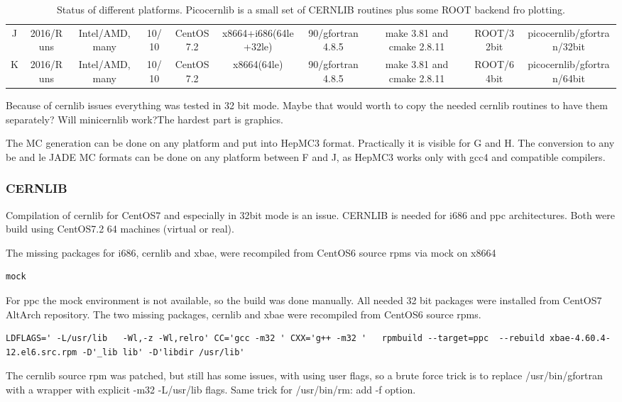\begin{sidewaystable}[htbp]
\begin{tabular}{|c|c|c|c|c|c|c|c|c|c|}
J   & 2016/Runs         &  Intel/AMD, many            &10/10   &CentOS7.2 & x8664+i686(64le+32le)   & 90/gfortran 4.8.5         &make 3.81 and cmake 2.8.11      &ROOT/32bit& picocernlib/gfortran/32bit     \\
K   & 2016/Runs         &  Intel/AMD, many            &10/10   &CentOS7.2 & x8664(64le)             & 90/gfortran 4.8.5         &make 3.81 and cmake 2.8.11      &ROOT/64bit& picocernlib/gfortran/64bit\\
\hline
\end{tabular}
\caption{Status of different platforms.  Picocernlib is a small set of CERNLIB routines plus some ROOT backend fro plotting. }
\label{tab:status}
\end{sidewaystable}


Because of cernlib issues everything was tested in 32 bit mode.
Maybe that would worth to copy the needed cernlib routines to have them separately?
Will minicernlib work?The hardest part is graphics.

The MC generation can be done on any platform and put into HepMC3 format.
Practically it is visible for G and H.
The conversion to any be and le JADE MC formats can be done on any platform between F and J,
as HepMC3 works only with gcc4 and compatible compilers. 



\subsubsection{CERNLIB}
Compilation of cernlib for CentOS7 and especially in 32bit mode is an issue.
CERNLIB is needed for i686 and ppc architectures.
Both were build using CentOS7.2 64 machines (virtual or real).



The missing packages for i686, cernlib and xbae, were recompiled from CentOS6 source rpms via mock on x8664
\begin{verbatim}
mock
\end{verbatim}



For ppc the mock environment is not available, so the build was done manually.
All needed 32 bit packages were installed from CentOS7 AltArch repository.
The two missing packages, cernlib and xbae were recompiled from CentOS6 source rpms.
\begin{Verbatim}[fontsize=\tiny]
LDFLAGS=' -L/usr/lib   -Wl,-z -Wl,relro' CC='gcc -m32 ' CXX='g++ -m32 '   rpmbuild --target=ppc  --rebuild xbae-4.60.4-12.el6.src.rpm -D'_lib lib' -D'libdir /usr/lib'
\end{Verbatim}
The cernlib source rpm was patched, but still has some issues, with using user flags, so
a brute force trick is to replace /usr/bin/gfortran with a wrapper with explicit -m32 -L/usr/lib flags.
Same trick for /usr/bin/rm:   add -f option.

